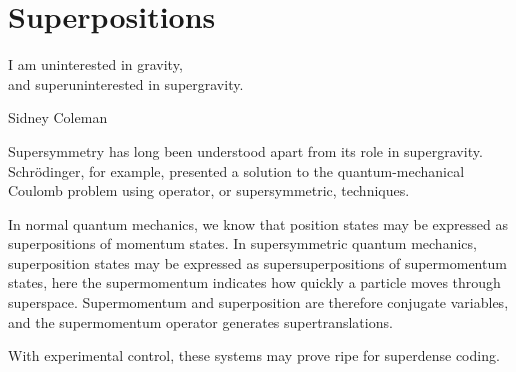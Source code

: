 \section{Superpositions}
\epigraph{I am uninterested in gravity,\\
and superuninterested in supergravity.}{Sidney Coleman\cite{vanNieuwenhuizen:2016}}

Supersymmetry has long been understood apart from its role in supergravity.
Schr\"{o}dinger, for example, presented a solution\cite{10.2307/20490744} to the quantum-mechanical Coulomb problem using operator, or supersymmetric, techniques\cite{RevModPhys.23.21}.

In normal quantum mechanics, we know that position states may be expressed as superpositions of momentum states.
In supersymmetric quantum mechanics, superposition states may be expressed as supersuperpositions of supermomentum states, here the supermomentum indicates how quickly a particle moves through superspace.
Supermomentum and superposition are therefore conjugate variables, and the supermomentum operator generates supertranslations.

With experimental control, these systems may prove ripe for superdense coding\cite{PhysRevLett.69.2881}.